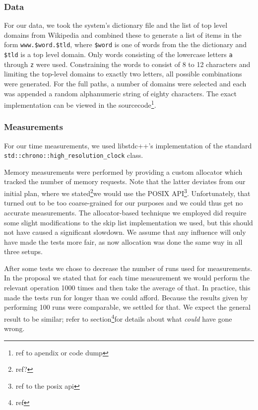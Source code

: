\documentclass[12pt,a4paper]{article}
\begin{document}
    \subsubsection*{Data}
    For our data, we took the system's dictionary file and the list of top level domains from Wikipedia
    and combined these to generate a list of items in the form \texttt{www.\$word.\$tld}, where
    \texttt{\$word} is one of words from the the dictionary and \texttt{\$tld} is a top level domain.  Only
    words consisting of the lowercase letters \texttt{a} through \texttt{z} were used.  Constraining the
    words to consist of 8 to 12 characters and limiting the top-level domains to exactly two letters, 
    all possible combinations were generated.  For the full paths, a number of domains were selected
    and each was appended a random alphanumeric string of eighty characters.  The exact implementation
    can be viewed in the sourcecode\footnote{ref to apendix or code dump}.

	\subsubsection*{Measurements}
    For our time measurements, we used libstdc++'s implementation of the standard
    \texttt{std::chrono::high\_resolution\_clock} class.
    
    Memory measurements were performed by providing a custom allocator which tracked the number of memory
    requests.  Note that the latter deviates from our initial plan, where we stated\footnote{ref?}we would
    use the POSIX API\footnote{ref to the posix api}.  Unfortunately, that turned out to be too
    coarse-grained for our purposes and we could thus get no accurate measurements.  The
    allocator-based technique we employed did require some slight modifications to the skip list
    implementation we used, but this should not have caused a significant slowdown. We assume that any 
    influence will only have made the tests more fair, as now allocation was done the same way in all 
    three setups.

    After some tests we chose to decrease the number of runs used for measurements.  In the
    proposal we stated that for each time measurement we would perform the relevant operation 1000
    times and then take the average of that.  In practice, this made the tests run for longer than
    we could afford. Because the results given by performing 100 runs were comparable, we settled for that.  
    We expect the general result to be similar; refer to section\footnote{ref}for details
    about what \emph{could} have gone wrong.
\end{document}
